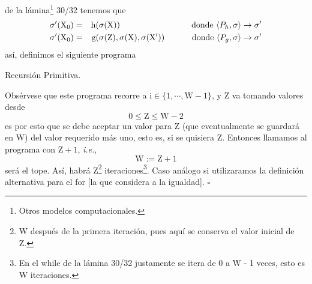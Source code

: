 \documentclass{article}
\begin{document}
\begin{enumerate}
\begin{center}
{\begin{minipage}[b][1\height]
    \end{minipage}}
  \end{center}
  de la lámina\footnote{Otros modelos computacionales.} 30/32 tenemos que
  \begin{eqnarray*}
    \mathrm{\sigma'(X_0)} &=& \mathrm{h(\sigma(X))}
    \hspace*{3cm} \text{donde } \langle P_h, \sigma \rangle \rightarrow \sigma'\\
    \mathrm{\sigma'(X_0)} &=& \mathrm{g(\sigma(Z), \sigma(X), \sigma(X'))}
    \hspace*{1.15cm} \text{donde } \langle P_g, \sigma \rangle \rightarrow \sigma'
  \end{eqnarray*}
  así, definimos el siguiente programa
\end{enumerate}
\begin{algorithm}[H]
  \SetAlgorithmName{}{}%
  \DontPrintSemicolon

             {}
             \caption{Recursión Primitiva.} \label{sigma}%
             \DecMargin{1em}
\end{algorithm}
Obsérvese que este programa recorre a $\mathrm{i \in \{1, \dotsm, W - 1\}}$, y $\mathrm{Z}$ va tomando valores desde
\[\mathrm{0 \leq Z \leq W - 2}\]
es por esto que se debe aceptar un valor para Z (que eventualmente se guardará en W) del valor requerido
más uno, esto es, si se quisiera Z. Entonces llamamos al programa con $\mathrm{Z + 1}$, \textit{i.e.},
\[\mathrm{W := Z + 1}\]
será el tope. Así, habrá Z\footnote{W después de la primera iteración, pues aquí se conserva el valor inicial de Z.}
iteraciones\footnote{En el while de la lámina 30/32 justamente se itera de 0 a W - 1 veces, esto es W iteraciones.}.
Caso análogo si utilizaramos la definición alternativa para el for [la que considera a la igualdad].
\hfill $\square$
\end{document}
